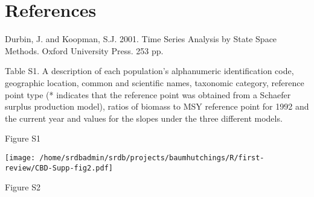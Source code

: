 \documentclass[letterpaper,12pt]{article}
\begin{document}
\section*{References}

Durbin, J. and Koopman, S.J. 2001. Time Series Analysis by State Space Methods. Oxford University Press. 253 pp.

\clearpage

\noindent Table S1. A description of each population's alphanumeric identification code, geographic location, common and scientific names, taxonomic category, reference point type (* indicates that the reference point was obtained from a Schaefer surplus production model), ratios of biomass to MSY reference point for 1992 and the current year and values for the slopes under the three different models.

\begin{landscape}
\begin{tiny}

\end{tiny}
\end{landscape}

\clearpage

\begin{center}

\end{center}
\noindent 
Figure S1

\clearpage

\begin{center}
\texttt{[image: /home/srdbadmin/srdb/projects/baumhutchings/R/first-review/CBD-Supp-fig2.pdf]}
\end{center}
\noindent 
Figure S2
\end{document}
